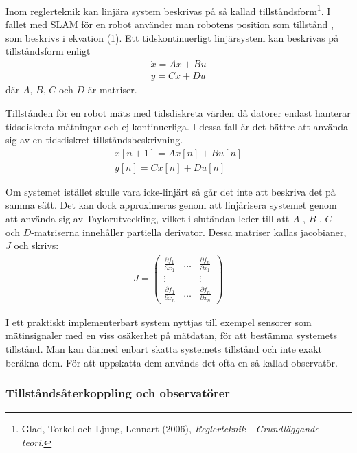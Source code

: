 \documentclass[a4paper,12pt,fleqn]{article}
\begin{document}
Inom reglerteknik kan linjära system beskrivas på så kallad tillståndsform\footnote{Glad, Torkel och Ljung, Lennart (2006), \textit{Reglerteknik - Grundläggande teori}.}. I fallet med SLAM för en robot använder man robotens position som tillstånd , som beskrivs i ekvation (1). Ett tidskontinuerligt linjärsystem kan beskrivas på tillståndsform enligt
\begin{gather}
\dot{x}=Ax+Bu \\
y=Cx+Du	
\label{equ:tillstand}
\end{gather}
där $A$, $B$, $C$ och $D$ är matriser.

Tillstånden för en robot mäts med tidsdiskreta värden då datorer endast hanterar tidsdiskreta mätningar och ej kontinuerliga. I dessa fall är det bättre att använda sig av en tidsdiskret tillståndsbeskrivning.
\begin{gather}
x[n+1] = Ax[n] + Bu[n] \\
y[n] = Cx[n] + Du[n]
\label{equ:disktillstand}
\end{gather}

Om systemet istället skulle vara icke-linjärt så går det inte att beskriva det på samma sätt. Det kan dock approximeras genom att linjärisera systemet genom att använda sig av Taylorutveckling, vilket i slutändan leder till att $A$-, $B$-, $C$- och $D$-matriserna innehåller partiella derivator. Dessa matriser kallas jacobianer, $J$ och skrivs:
\begin{gather}
	J= \begin{pmatrix}
	\frac{\partial f_1}{\partial x_1} & \dots & \frac{\partial f_n}{\partial x_1} \\
	  							\vdots &       & \vdots \\
	  \frac{\partial f_1}{\partial x_n} & \dots & \frac{\partial f_n}{\partial x_n}
	  \end{pmatrix}
\end{gather}



I ett praktiskt implementerbart system nyttjas till exempel sensorer som mätinsignaler med en viss osäkerhet på mätdatan, för att bestämma systemets tillstånd. Man kan därmed enbart skatta systemets tillstånd och inte exakt beräkna dem. För att uppskatta dem används det ofta en så kallad observatör.

\subsubsection{Tillståndsåterkoppling och observatörer}
\end{document}
